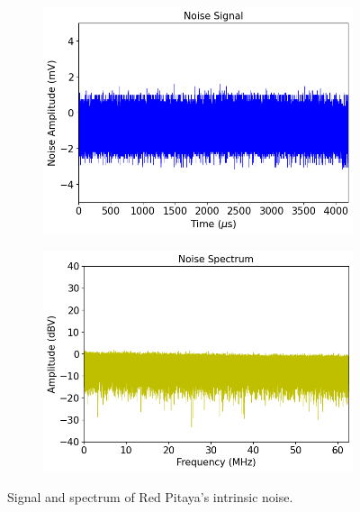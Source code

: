 \begin{figure}[ht]
    \centering
    \begin{subfigure}[t]{0.48\linewidth}
        \centering
        \includegraphics[width=\textwidth]{images/chapter_2/2_noise/signal.png}
        \caption{}
        \label{fig:ch2_signal}
    \end{subfigure}
    \hspace{.025\linewidth}
    \begin{subfigure}[t]{0.48\linewidth}
        \centering
        \includegraphics[width=\textwidth]{images/chapter_2/2_noise/spectrum.png}
        \caption{}
        \label{fig:ch2_spectrum}
    \end{subfigure}
    \caption{Signal and spectrum of Red Pitaya's intrinsic noise.}
    \label{fig:ch2_intrinsic}
\end{figure}

